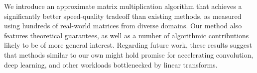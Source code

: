 \documentclass{article}  %
\begin{document}
We introduce an approximate matrix multiplication algorithm that achieves a significantly better speed-quality tradeoff than existing methods, as measured using hundreds of real-world matrices from diverse domains. Our method also features theoretical guarantees, as well as a number of algorithmic contributions likely to be of more general interest. Regarding future work, these results suggest that methods similar to our own might hold promise for accelerating convolution, deep learning, and other workloads bottlenecked by linear transforms. %




% 
% 
% 

% 




\clearpage
\newpage  %
\appendix

\end{document}
